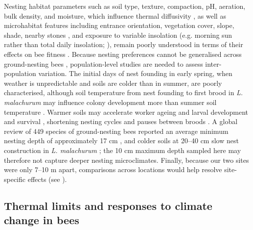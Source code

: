 \documentclass[11pt,a4paper]{article}
\begin{document}
Nesting habitat parameters such as soil type, texture, compaction, pH, aeration, bulk density, and moisture, which influence thermal diffusivity \citep{Marshall1996}, as well as microhabitat features including entrance orientation, vegetation cover, slope, shade, nearby stones \citep{Jones2006, Antoine2021, Packer1989, Packer1986b, Cane2015, Potts1997, Shebl2016}, and exposure to variable insolation (e.g. morning sun rather than total daily insolation; \citep{Sakagami1961}), remain poorly understood in terms of their effects on bee fitness \citep{Antoine2021}. Because nesting preferences cannot be generalised across ground-nesting bees \citep{Harmon2020}, population-level studies are needed to assess inter-population variation. The initial days of nest founding in early spring, when weather is unpredictable and soils are colder than in summer, are poorly characterised, although soil temperature from nest founding to first brood in \textit{L. malachurum} may influence colony development more than summer soil temperature \citep{Weissel2006}. Warmer soils may accelerate worker ageing and larval development and survival \citep{Cossins2012, Jeanne1992, Whitfield1992}, shortening nesting cycles and pauses between broods \citep{Weissel2006}. A global review of 449 species of ground-nesting bees reported an average minimum nesting depth of approximately 17 cm \citep{Cane2011}, and colder soils at 20--40 cm slow nest construction in \textit{L. malachurum} \citep{Weissel2006}; the 10 cm maximum depth sampled here may therefore not capture deeper nesting microclimates. Finally, because our two sites were only 7--10 m apart, comparisons across locations would help resolve site-specific effects (see \citealp{Stone1994, Redding2003, Davis2019, Mikola2018}).

\subsection{Thermal limits and responses to climate change in bees}
\end{document}
